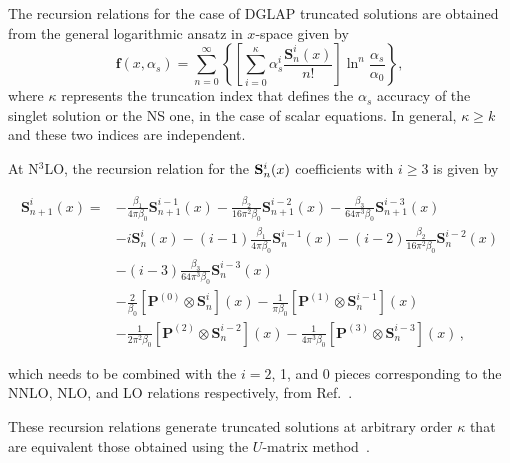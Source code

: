 \documentclass[preprint,12pt]{elsarticle}
\newcommand{\vv}[1]{\bm{\mathbf{#1}}}
\begin{document}
The recursion relations for the case of DGLAP truncated solutions are obtained from the general logarithmic ansatz   
in $x$-space given by
%
\begin{equation}
\vv{f}(x,\alpha_s) = \sum_{n=0}^\infty \left\{ \left[ \sum_{i=0}^\kappa \alpha_s^i \frac{\vv{S}^i_n(x)}{n!} \right] \ln^n \frac{\alpha_s}{\alpha_0} \right\},
\label{log-ansatz}
\end{equation}
%
where $\kappa$ represents the truncation index that defines the $\alpha_s$ accuracy of the singlet solution or the NS one, in the case of scalar equations. In general, $\kappa\geq k$ and these two indices are independent.     

At N$^3$LO, the recursion relation for the ${\bf S}^{i}_{n}(x)$ coefficients with $i\geq 3$ is given by

\begin{align}
  \vv{S}_{n+1}^i(x) = &-\frac{\beta_1}{4\pi\beta_0}\vv{S}_{n+1}^{i-1}(x)
-\frac{\beta_2}{16\pi^2\beta_0}\vv{S}_{n+1} ^{i-2}(x)
-\frac{\beta_3}{64\pi^3\beta_0}\vv{S}^{i-3}_{n+1}(x) 
\nonumber\\
&-i\vv{S}_n^i(x)-(i-1)\frac{\beta_1}{4\pi\beta_0}\vv{S}_n^{i-1}(x)
-(i-2)\frac{\beta_2}{16\pi^2\beta_0}\vv{S}_n^{i-2}(x) \nonumber\\
&-(i-3)\frac{\beta_3}{64\pi^3\beta_0}\vv{S}_n^{i-3}(x) \nonumber\\
&-\frac{2}{\beta_0}[\vv{P}^{(0)}\otimes\vv{S}_n^i](x)
-\frac{1}{\pi\beta_0}[\vv{P}^{(1)}\otimes\vv{S}_n^{i-1}](x)\nonumber\\
&-\frac{1}{2\pi^2\beta_0}[\vv{P}^{(2)}\otimes\vv{S}_n^{i-2}](x)
-\frac{1}{4\pi^3\beta_0}[\vv{P}^{(3)}\otimes\vv{S}_n^{i-3}](x)\,,
\label{eq:singlet-n3lo}
\end{align}

which needs to be combined with the $i=2$, 1, and 0 pieces corresponding to the NNLO, NLO, and LO relations respectively, from Ref.~\cite{Hampson:2025pvi}.

These recursion relations generate truncated solutions at arbitrary order $\kappa$ that are equivalent those obtained using the $U$-matrix method~\cite{Blumlein:1997em,Vogt:2004ns,Cafarella:2005zj}.  
\end{document}

